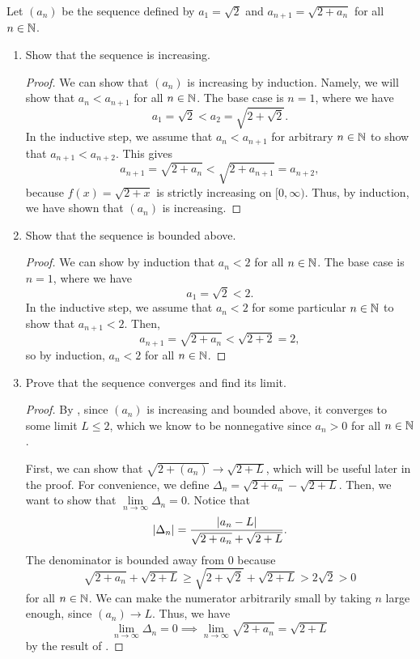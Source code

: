 \begin{problem}
  Let $(a_{n})$ be the sequence defined by $a_{1} = \sqrt{2}$ and $a_{n+1} = \sqrt{2 + a_{n}}$ for all $n \in \mathbb{N}$.

  \begin{enumerate}[label=(\alph*)]
    \item Show that the sequence is increasing.
      
      \begin{proof}
        We can show that $(a_{n})$ is increasing by induction. Namely, we will show
        that $a_{n} < a_{n+1}$ for all $n \in \mathbb{N}$. The base case is $n = 1$, where we have
        \[
          a_{1} = \sqrt{2} < a_{2} = \sqrt{2 + \sqrt{2}}.
        \] 
        In the inductive step, we assume that $a_{n} < a_{n+1}$ for arbitrary $n \in \mathbb{N}$ to show
        that $a_{n+1} < a_{n+2}$. This gives
        \[
          a_{n+1} = \sqrt{2 + a_{n}} < \sqrt{2 + a_{n+1}} = a_{n+2},
        \]
      because $f(x) = \sqrt{2 + x}$ is strictly increasing on $[0, \infty)$. Thus, by induction, we have shown that $(a_{n})$ is increasing.
      \end{proof}

    \item Show that the sequence is bounded above.

      \begin{proof}
        We can show by induction that $a_{n} < 2$ for all $n \in \mathbb{N}$. The base case is $n = 1$, where we have
        \[
          a_{1} = \sqrt{2} < 2.
        \]
        In the inductive step, we assume that $a_{n} < 2$ for some particular $n \in \mathbb{N}$ to show that $a_{n+1} < 2$. Then,
        \[
          a_{n+1} = \sqrt{2 + a_{n}} < \sqrt{2 + 2} = 2,
        \]
        so by induction, $a_{n} < 2$ for all $n \in \mathbb{N}$.
      \end{proof}

    \item Prove that the sequence converges and find its limit. 

      \begin{proof}
        By , since $(a_{n})$ is increasing and bounded above, it converges to some limit $L \leq 2$,
        which we know to be nonnegative since $a_{n} > 0$ for all $n \in \mathbb{N}$.

        First, we can show that $\sqrt{2 + (a_{n})} \to \sqrt{2 + L}$, which will be useful later in the proof.
        For convenience, we define $\Delta_{n} = \sqrt{2 + a_{n}} - \sqrt{2 + L}$. Then, we want to show
        that $\lim\limits_{n \to \infty} \Delta_{n} = 0$. Notice that
        \[
          \left\lvert \Delta_{n} \right\rvert = \frac{\left\lvert a_{n} - L \right\rvert}{\sqrt{2 + a_{n}} + \sqrt{2 + L}}.
        \]
        The denominator is bounded away from $0$ because
        \[
          \sqrt{2 + a_{n}} + \sqrt{2 + L} \geq \sqrt{2 + \sqrt{2}} + \sqrt{2 + L} > 2\sqrt{2} > 0 
        \]
        for all $n \in \mathbb{N}$. We can make the numerator arbitrarily small by taking $n$ large enough, since $(a_{n}) \to L$. Thus, we have
        \[
          \lim_{n \to \infty} \Delta_{n} = 0 \implies \lim_{n \to \infty} \sqrt{2 + a_{n}} = \sqrt{2 + L}
        \]
        by the result of .


\end{proof}
\end{enumerate}
\end{problem}
